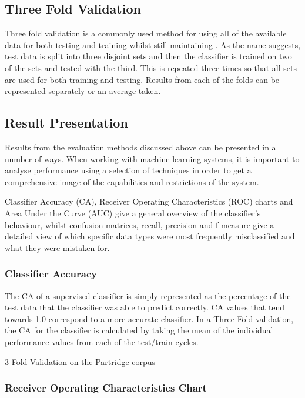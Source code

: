 \subsection{ Three Fold Validation }

Three fold validation is a commonly used method for using all of the available
data for both testing and training whilst still maintaining . As the name
suggests, test data is split into three disjoint sets and then the classifier
is trained on two of the sets and tested with the third. This is repeated three
times so that all sets are used for both training and testing. Results from
each of the folds can be represented separately or an average taken.

\subsection{ Result Presentation } 

Results from the evaluation methods discussed above can be presented in a
number of ways. When working with machine learning systems, it is important to
analyse performance using a selection of techniques in order to get a
comprehensive image of the capabilities and restrictions of the system.

Classifier Accuracy (CA), Receiver Operating Characteristics
(ROC) charts and Area Under the Curve (AUC) give a general overview of the
classifier's behaviour, whilst confusion matrices, recall, precision and
f-measure give a detailed view of which specific data types were most
frequently misclassified and what they were mistaken for. 

\subsubsection{ Classifier Accuracy } 

The CA of a supervised classifier is simply represented as the percentage of
the test data that the classifier was able to predict correctly. CA values that
tend towards 1.0 correspond to a more accurate classifier. In a Three Fold
validation, the CA for the classifier is calculated by taking the mean of the
individual performance values from each of the test/train cycles. 

3 Fold Validation on the Partridge corpus  

\subsubsection{ Receiver Operating Characteristics Chart}

